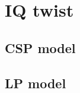 \section{IQ twist}
\label{sec:IQ twist}
\subsection{CSP model}
\label{sec:CSP model}
\subsection{LP model}
\label{sec:LP model}
